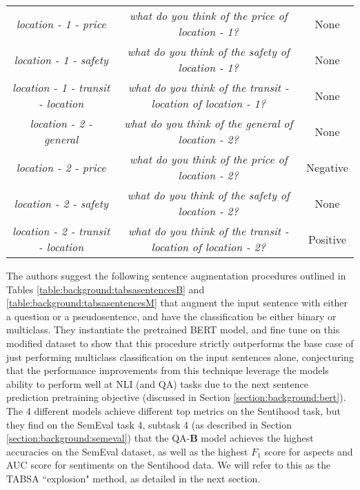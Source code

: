 {{\begin{center}
{\begin{tabular}{|c|c|c|}
		\textit{{\color{black} location - 1} - {\color{cyan} price}} & \textit{what do you think of the {\color{cyan} price} of {\color{black} location - 1}?} & {\color{gray} None} \\
		\textit{{\color{black} location - 1} - {\color{orange} safety}} & \textit{what do you think of the {\color{orange} safety} of {\color{black} location - 1}?} & {\color{gray} None} \\
		\textit{{\color{black} location - 1} - {\color{pink} transit - location}} & \textit{what do you think of the {\color{pink} transit - location} of {\color{black} location - 1}?} & {\color{gray} None} \\
		\hline \hline
		\textit{{\color{black} location - 2} - {\color{purple} general}} & \textit{what do you think of the {\color{purple} general} of {\color{black} location - 2}?} & {\color{gray} None} \\
		\textit{{\color{black} location - 2} - {\color{cyan} price}} & \textit{what do you think of the {\color{cyan} price} of {\color{black} location - 2}?} & {\color{red} Negative} \\
		\textit{{\color{black} location - 2} - {\color{orange} safety}} & \textit{what do you think of the {\color{orange} safety} of {\color{black} location - 2}?} & {\color{gray} None} \\
		\textit{{\color{black} location - 2} - {\color{pink} transit - location}} & \textit{what do you think of the {\color{pink} transit - location} of {\color{black} location - 2}?} & {\color{green} Positive} \\
		\hline
	\end{tabular}}
	 \label{table:background:tabsasentencesM}
\end{center}

The authors suggest the following sentence augmentation procedures outlined in Tables \ref{table:background:tabsasentencesB} and \ref{table:background:tabsasentencesM} that augment the input sentence with either a question or a pseudosentence, and have the classification be either binary or multiclass. They instantiate the pretrained BERT \cite{Devlin2018} model, and fine tune on this modified dataset to show that this procedure strictly outperforms the base case of just performing multiclass classification on the input sentences alone, conjecturing that the performance improvements from this technique leverage the models ability to perform well at NLI (and QA) tasks due to the next sentence prediction pretraining objective (discussed in Section \ref{section:background:bert}). The 4 different models achieve different top metrics on the Sentihood task, but they find on the SemEval task 4, subtask 4 (as described in Section \ref{section:background:semeval}) that the QA-\textbf{B} model achieves the highest accuracies on the SemEval dataset, as well as the highest $F_1$ score for aspects and AUC score for sentiments on the Sentihood data. We will refer to this as the TABSA ``explosion" method, as detailed in the next section.

}}
